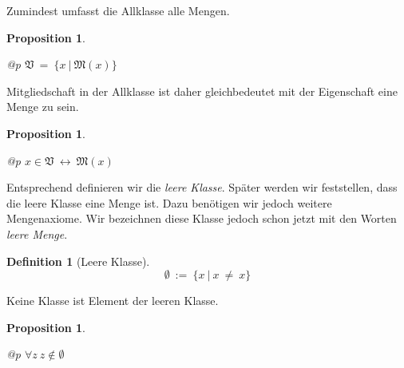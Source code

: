 \documentclass[a4paper,german,10pt,twoside]{book}
\newtheorem{prop}[thm]{Proposition}
\theoremstyle{definition}
\newtheorem{defn}[thm]{Definition}
\theoremstyle{remark}
\begin{document}
\par
Zumindest umfasst die Allklasse alle Mengen.

\begin{prop}
\label{theorem:universalClassContainsAllSets} \hypertarget{theorem:universalClassContainsAllSets}{}
\mbox{}
\begin{longtable}{{@{\extracolsep{\fill}}p{\linewidth}}}
\centering $\mathfrak{V} \ =  \ \{ x \ | \ \mathfrak{M}(x) \} $
\end{longtable}

\end{prop}




\par
Mitgliedschaft in der Allklasse ist daher gleichbedeutet mit der 
Eigenschaft eine Menge zu sein.

\begin{prop}
\label{theorem:isInUniversalClass} \hypertarget{theorem:isInUniversalClass}{}
\mbox{}
\begin{longtable}{{@{\extracolsep{\fill}}p{\linewidth}}}
\centering $x \in \mathfrak{V}\ \leftrightarrow \ \mathfrak{M}(x)$
\end{longtable}

\end{prop}




\par
Entsprechend definieren wir die \emph{leere Klasse}. Sp{\"a}ter werden wir feststellen, dass die leere Klasse
eine Menge ist. Dazu ben{\"o}tigen wir jedoch weitere Mengenaxiome. Wir bezeichnen diese Klasse jedoch
schon jetzt mit den Worten \emph{leere Menge}.

\begin{defn}[Leere Klasse]
\label{definition:emptySet} \hypertarget{definition:emptySet}{}
$$\emptyset\ := \ \{ x \ | \ x \ \neq \ x \} $$

\end{defn}




\par
Keine Klasse ist Element der leeren Klasse.

\begin{prop}
\label{theorem:noClassIsMemberOfEmptySet} \hypertarget{theorem:noClassIsMemberOfEmptySet}{}
\mbox{}
\begin{longtable}{{@{\extracolsep{\fill}}p{\linewidth}}}
\centering $\forall z\ z \notin \emptyset$
\end{longtable}

\end{prop}
\end{document}
